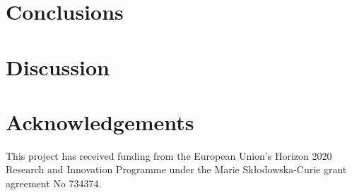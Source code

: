 \documentclass[a4paper,fleqn,usenatbib]{mnras}
\begin{document}
\section{Conclusions}

\section{Discussion}

\section*{Acknowledgements}
This project has received funding from the European Union’s Horizon
2020 Research and Innovation Programme under the Marie
Sk\l{}odowska-Curie grant agreement No 734374. 

 
 
\end{document}
